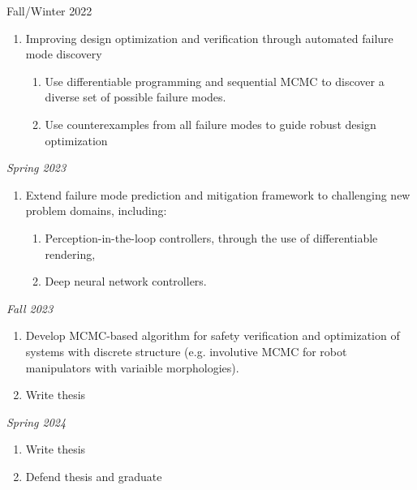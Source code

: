 Fall/Winter 2022
\begin{enumerate}
    \item Improving design optimization and verification through automated failure mode discovery
    \begin{enumerate}
        \item Use differentiable programming and sequential MCMC to discover a diverse set of possible failure modes.
        \item Use counterexamples from all failure modes to guide robust design optimization
    \end{enumerate}
\end{enumerate}

\textit{Spring 2023}
\begin{enumerate}
    \item Extend failure mode prediction and mitigation framework to challenging new problem domains, including:
    \begin{enumerate}
        \item Perception-in-the-loop controllers, through the use of differentiable rendering,
        \item Deep neural network controllers.
    \end{enumerate}
\end{enumerate}

\textit{Fall 2023}
\begin{enumerate}
    \item Develop MCMC-based algorithm for safety verification and optimization of systems with discrete structure (e.g. involutive MCMC for robot manipulators with variaible morphologies).
    \item Write thesis
\end{enumerate}

\textit{Spring 2024}
\begin{enumerate}
    \item Write thesis
    \item Defend thesis and graduate
\end{enumerate}
